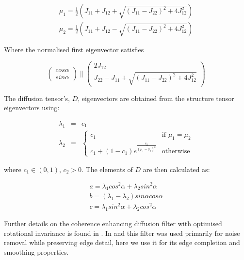 \begin{eqnarray}
\mu_{1} = \frac{1}{2}\left( J_{11} + J_{12} + \sqrt{(J_{11}-J_{22})^2+4J_{12}^2} \right) \\
\mu_{2} = \frac{1}{2}\left( J_{11} + J_{12} - \sqrt{(J_{11}-J_{22})^2+4J_{12}^2} \right)
\end{eqnarray}

Where the normalised first eigenvector satisfies

\begin{equation}
\begin{pmatrix}
cos \alpha \\
sin \alpha
\end{pmatrix} \parallel
\begin{pmatrix}
2J_{12} \\
J_{22}-J_{11}+\sqrt{(J_{11}-J_{22})^2 + 4J_{12}^2}
\end{pmatrix}
\end{equation}

The diffusion tensor's, $D$, eigenvectors are obtained from the structure tensor eigenvectors using:

\begin{eqnarray}
\lambda_1 &=& c_1 \\
\lambda_2 &=& \left\lbrace \begin{matrix}
c_1 & \text{if } \mu_1=\mu_2 \\
c_1+(1-c_1)e^{\frac{c_2}{(\mu_1-\mu_2)^2}}& \text{otherwise}
\end{matrix}
\right.
\end{eqnarray}

where $c_1 \in (0,1)$, $c_2>0$. The elements of $D$ are then calculated as:

\begin{eqnarray}
a = \lambda_1 cos^2 \alpha + \lambda_2 sin^2 \alpha \\
b = (\lambda_1 - \lambda_2)sin \alpha cos \alpha \\
c = \lambda_1 sin^2 \alpha + \lambda_2 cos^2 \alpha
\end{eqnarray}

Further details on the coherence enhancing diffusion filter with optimised rotational invariance is found in \cite{Weickert2002}. In \citep{Maska2013} and \citep{Kroon2009} this filter was used primarily for noise removal while preserving edge detail, here we use it for its edge completion and smoothing properties.

